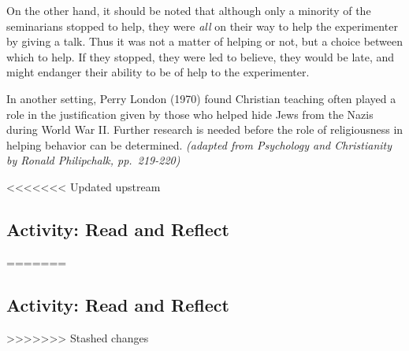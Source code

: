 \documentclass[
]{book}
\begin{document}
On the other hand, it should be noted that although only a minority of the seminarians stopped to help, they were \emph{all} on their way to help the experimenter by giving a talk. Thus it was not a matter of helping or not, but a choice between which to help. If they stopped, they were led to believe, they would be late, and might endanger their ability to be of help to the experimenter.

In another setting, Perry London (1970) found Christian teaching often played a role in the justification given by those who helped hide Jews from the Nazis during World War II. Further research is needed before the role of religiousness in helping behavior can be determined. \emph{(adapted from Psychology and Christianity by Ronald Philipchalk, pp.~219-220)}

<<<<<<< Updated upstream
\hypertarget{activity-read-and-reflect-10}{%
\subsection*{Activity: Read and Reflect}\label{activity-read-and-reflect-10}}
=======
\hypertarget{activity-read-and-reflect-9}{%
\subsection*{Activity: Read and Reflect}\label{activity-read-and-reflect-9}}
>>>>>>> Stashed changes
\end{document}
